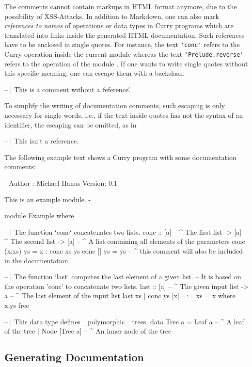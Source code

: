 \begin{description}
The comments cannot contain markups in HTML format anymore,
due to the possibility of XSS-Attacks.
In addition to Markdown,
one can also mark \emph{references to names} of operations or data types
in Curry programs which are translated into links inside
the generated HTML documentation. Such references have to be
enclosed in single quotes. For instance, the text
\verb!'conc'! refers to the Curry operation 
inside the current module whereas the text
\verb!'Prelude.reverse'! refers to the operation 
of the module .
If one wants to write single quotes without this specific
meaning, one can escape them with a backslash:
\begin{curry}
-- | This is a comment without a \'reference\'.
\end{curry}
To simplify the writing of documentation comments,
such escaping is only necessary for single words,
i.e., if the text inside quotes has not the syntax of
an identifier, the escaping can be omitted, as in
\begin{curry}
-- | This isn't a reference.
\end{curry}
%
The following example text shows a Curry program with some
documentation comments:
\begin{curry}
{-  Author : Michael Hanus
    Version: 0.1

    This is an
    example module.
-}
module Example where

-- | The function `conc` concatenates two lists.
conc :: [a] -- ^ The first list
     -> [a] -- ^ The second list
     -> [a] -- ^ A list containing all elements of the parameters
conc (x:xs) ys = x : conc xs ys
conc []     ys = ys
--  ^ this comment will also be included in the documentation

-- | The function `last` computes the last element of a given list.
--   It is based on the operation 'conc' to concatenate two lists.
last :: [a] -- ^ The given input list
     -> a   -- ^ The last element of the input list
last xs | conc ys [x] =:= xs  = x   where x,ys free

-- | This data type defines _polymorphic_ trees.
data Tree a = Leaf a -- ^ A leaf of the tree
            | Node [Tree a] -- ^ An inner node of the tree
\end{curry}

\subsection{Generating Documentation}


\end{description}
